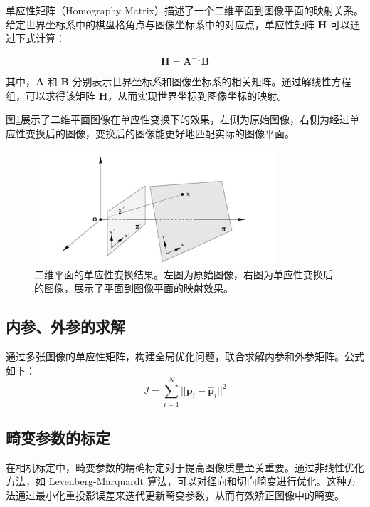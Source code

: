 \documentclass[hyperref,a4paper,UTF8]{ctexart}
\begin{document}
单应性矩阵（Homography Matrix）描述了一个二维平面到图像平面的映射关系。给定世界坐标系中的棋盘格角点与图像坐标系中的对应点，单应性矩阵 $\mathbf{H}$ 可以通过下式计算：

\begin{equation}
    \mathbf{H} = \mathbf{A}^{-1}\mathbf{B}
\end{equation}

其中，$\mathbf{A}$ 和 $\mathbf{B}$ 分别表示世界坐标系和图像坐标系的相关矩阵。通过解线性方程组，可以求得该矩阵 $\mathbf{H}$，从而实现世界坐标到图像坐标的映射\citep{zhang1998calibration}。

图\ref{fig:homography_transform}展示了二维平面图像在单应性变换下的效果，左侧为原始图像，右侧为经过单应性变换后的图像，变换后的图像能更好地匹配实际的图像平面。

\begin{figure}[h]
    \centering
    \includegraphics[width=0.8\textwidth]{assets/homography_transform.png}
    \caption{二维平面的单应性变换结果。左图为原始图像，右图为单应性变换后的图像，展示了平面到图像平面的映射效果。}
    \label{fig:homography_transform}
\end{figure}

\subsection{内参、外参的求解}

通过多张图像的单应性矩阵，构建全局优化问题，联合求解内参和外参矩阵。公式如下\citep{tsai1987calibration}：
\begin{equation}
    J = \sum_{i=1}^{N} ||\mathbf{p}_i - \hat{\mathbf{p}}_i||^2
\end{equation}

\subsection{畸变参数的标定}

在相机标定中，畸变参数的精确标定对于提高图像质量至关重要。通过非线性优化方法，如 Levenberg-Marquardt 算法，可以对径向和切向畸变进行优化\citep{weng1992camera}。这种方法通过最小化重投影误差来迭代更新畸变参数，从而有效矫正图像中的畸变。
\end{document}
